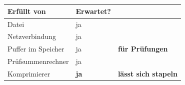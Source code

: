 \begin{merksatz}
\begin{technik}
\begin{center}
\begin{minipage}{0.86\textwidth}
\\
\\
\code{\}}
\end{minipage}
\end{center}

\begin{center}
\renewcommand{\arraystretch}{1.45}
\begin{tabular}{@{}P{2.8cm}P{2.4cm}P{2.8cm}@{}}
\toprule
\textbf{Erfüllt von} & \textbf{Erwartet?} & \\
\midrule
Datei & \textcolor{gruen}{ja} & \\
Netzverbindung & \textcolor{gruen}{ja} & \\
Puffer im Speicher & \textcolor{gruen}{ja} & \textcolor{gruen}{\textbf{für Prüfungen}}\\
Prüfsummen\-rechner & \textcolor{gruen}{ja} & \\
Komprimierer & \textcolor{gruen}{\textbf{ja}} & \textbf{lässt sich stapeln}\\
\bottomrule
\end{tabular}
\end{center}

\begin{center}
\begin{minipage}{0.86\textwidth}
\end{minipage}
\end{center}
\end{technik}
\end{merksatz}

